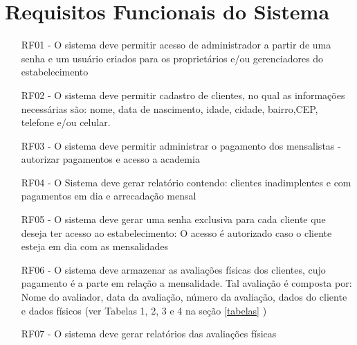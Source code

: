 





\section{Requisitos Funcionais do Sistema}
\label{secrf}
\begin{itemize}

\item[RF01 -]O sistema deve permitir acesso de administrador a partir de uma senha e um usuário criados para os proprietários e/ou gerenciadores do estabelecimento
\item[RF02 -] O sistema deve permitir cadastro de clientes, no qual as informações necessárias são: nome, data de nascimento, idade, cidade, bairro,CEP, telefone e/ou celular.
\item[RF03 -] O sistema deve permitir administrar o pagamento dos mensalistas - autorizar pagamentos e acesso a academia
\item[RF04 -] O Sistema deve gerar relatório contendo: clientes inadimplentes e com pagamentos em dia e arrecadação mensal
\item[RF05 -] O sistema deve gerar uma senha exclusiva para cada cliente que deseja ter acesso ao estabelecimento: O acesso é autorizado caso o cliente esteja em dia com as mensalidades
\item[RF06 -] O sistema deve armazenar as avaliações físicas dos clientes, cujo pagamento é a parte em relação a mensalidade. Tal avaliação é composta por: Nome do avaliador, data da avaliação, número da avaliação, dados do cliente e dados físicos (ver Tabelas 1, 2, 3 e 4 na seção \ref{tabelas} ) 
\item[RF07 - ] O sistema deve gerar relatórios das avaliações físicas


\end{itemize}


